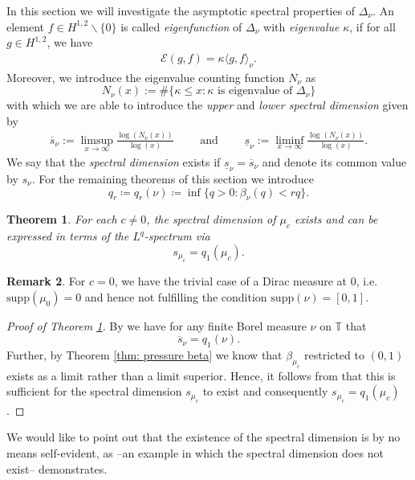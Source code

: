 \documentclass[11pt,reqno]{amsart}
\theoremstyle{plain}
\newtheorem{theorem}{Theorem}[section]
\theoremstyle{definition}
\newtheorem{remark}[theorem]{Remark}
\newcommand{\T}{{\mathbb T}}
\newcommand{\supp}{\mathrm{supp}}
\begin{document}
In this section we will investigate the asymptotic spectral properties of $\Delta_{\nu}$. 
An element $f \in H^{1,2} \backslash\{0\}$ is called \emph{eigenfunction} of $\Delta_{\nu}$ with \emph{eigenvalue} $\kappa$, if for all $g \in H^{1,2}$, we have
\begin{align*}
 \mathcal{E}( g, f) = \kappa  \langle g, f\rangle_{\nu}.
\end{align*}
Moreover, we introduce the eigenvalue counting function $N_{\nu}$ as 
\[
N_{\nu}(x):=\#\{\kappa\leqslant x:  \kappa \text{ is eigenvalue of }\Delta_{\nu}\}
\]
with which we are able to introduce the \emph{upper} and \emph{lower spectral dimension} given by 
\begin{align*}
 \overline{s}_{\nu} := \limsup_{x\to\infty}\frac{\log (N_{\nu} (x))}{\log(x)}\qquad 
 \text{ and }\qquad
\underline{s}_{\nu} := \liminf_{x\to\infty}\frac{ \log (N_{\nu} (x))}{\log(x)}.
\end{align*}
We say that the \emph{spectral dimension} exists if $\underline{s}_{\nu}= \overline{s}_{\nu}$ and denote its common value by $s_{\nu}$. For the remaining theorems of this section we introduce 
\[q_{r}\coloneqq q_r (\nu) \coloneqq \inf \{q > 0 : \beta_{\nu} (q) < rq\}.\]

\begin{theorem}\label{thm: specdim}
 For each $c \neq 0$, the spectral dimension of $\mu_{c}$ exists and can be expressed in terms of the $L^{q}$-spectrum via
 \[
 s_{\mu_{c}}=q_1(\mu_{c}).
 \]
\end{theorem}


\begin{remark}
 For $c=0$, we have the trivial case of a Dirac measure at $0$, i.e.\ $\supp(\mu_0)=0$ and hence not fulfilling the condition $\supp(\nu)=[0,1]$.
\end{remark}

\begin{proof}[Proof of Theorem \ref{thm: specdim}]  
By  \cite[Thm.~1.1]{KessNie} we have for any finite Borel measure $\nu$ on $\T$  that
  \[\overline s_{\nu}=q_{1}(\nu).\] 
Further, by Theorem \ref{thm: pressure beta} we know that $\beta_{\mu_{c}}$ restricted to    $(0,1)$ exists as a limit  rather than a limit superior. Hence, it follows from   \cite[Thm.~1.1 \& 1.2]{KessNie} that this is sufficient for  the spectral dimension  $s_{\mu_{c}}$ to  exist and consequently $s_{\mu_{c}}=q_1(\mu_{c})$.  
\end{proof}
 
 
We would like to point out that the existence of the spectral dimension is by no means self-evident, as \cite[Ex.~5.5]{KessNie} --an example in which the spectral dimension does not exist-- demonstrates.      
\end{document}
